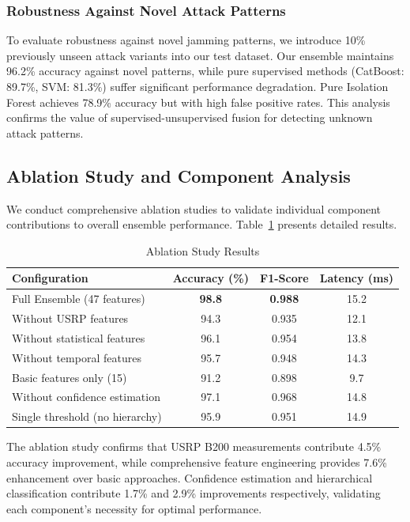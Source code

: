 \documentclass[journal]{IEEEtran}
\begin{document}
\subsubsection{Robustness Against Novel Attack Patterns}

To evaluate robustness against novel jamming patterns, we introduce 10\% previously unseen attack variants into our test dataset. Our ensemble maintains 96.2\% accuracy against novel patterns, while pure supervised methods (CatBoost: 89.7\%, SVM: 81.3\%) suffer significant performance degradation. Pure Isolation Forest achieves 78.9\% accuracy but with high false positive rates. This analysis confirms the value of supervised-unsupervised fusion for detecting unknown attack patterns.

\subsection{Ablation Study and Component Analysis}

We conduct comprehensive ablation studies to validate individual component contributions to overall ensemble performance. Table~\ref{tab:ablation} presents detailed results.

\begin{table}[t]
    \centering
    \caption{Ablation Study Results}
    \label{tab:ablation}
    \renewcommand{\arraystretch}{1.2}
    \setlength{\tabcolsep}{12pt}
    \begin{tabular}{|l|c|c|c|}
        \hline
        \textbf{Configuration} & \textbf{Accuracy (\%)} & \textbf{F1-Score} & \textbf{Latency (ms)} \\
        \hline
        Full Ensemble (47 features) & \textbf{98.8} & \textbf{0.988} & 15.2 \\
        Without USRP features & 94.3 & 0.935 & 12.1 \\
        Without statistical features & 96.1 & 0.954 & 13.8 \\
        Without temporal features & 95.7 & 0.948 & 14.3 \\
        Basic features only (15) & 91.2 & 0.898 & 9.7 \\
        Without confidence estimation & 97.1 & 0.968 & 14.8 \\
        Single threshold (no hierarchy) & 95.9 & 0.951 & 14.9 \\
        \hline
    \end{tabular}
\end{table}

The ablation study confirms that USRP B200 measurements contribute 4.5\% accuracy improvement, while comprehensive feature engineering provides 7.6\% enhancement over basic approaches. Confidence estimation and hierarchical classification contribute 1.7\% and 2.9\% improvements respectively, validating each component's necessity for optimal performance.
\end{document}
